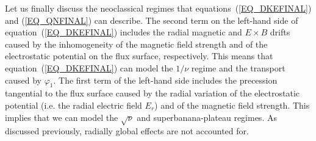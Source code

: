Let us finally discuss the neoclassical regimes that equations~(\ref{EQ_DKEFINAL}) and (\ref{EQ_QNFINAL}) can describe. The second term on the left-hand side of equation~(\ref{EQ_DKEFINAL}) includes the radial magnetic and $E\times B$ drifts caused by the inhomogeneity of the magnetic field strength and of the electrostatic potential on the flux surface, respectively. This means that equation~(\ref{EQ_DKEFINAL}) can model the $1/\nu$ regime and the transport caused by $\varphi_1$. The first term of the left-hand side includes the precession tangential to the flux surface caused by the radial variation of the electrostatic potential (i.e. the radial electric field $E_r$) and of the magnetic field strength. This implies that we can model the $\sqrt{\nu}$ and superbanana-plateau regimes. As discussed previously, radially global effects are not accounted for.








%

